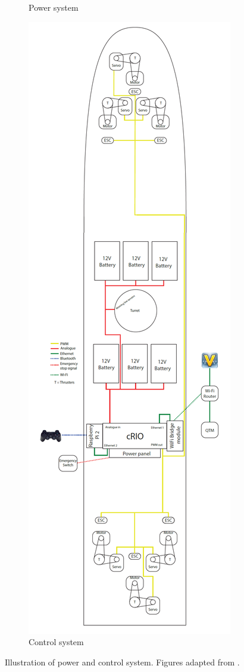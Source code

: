 \begin{figure}[h!]
\begin{subfigure}{0.3\textwidth}
		\caption{Power system}
		\label{fig:power_system}
	\end{subfigure}
\qquad \qquad
	\begin{subfigure}{0.3\textwidth}
		\centering
		\includegraphics[height=0.9\textheight]{fig/control_system.png}
		\caption{Control system}
		\label{fig:control_system}
	\end{subfigure}
\caption{Illustration of power and control system. Figures adapted from \cite{bjorno2016thruster}.}
\label{fig:power_and_control_system}
\end{figure}
